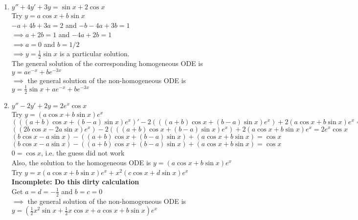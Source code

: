\documentclass[a4paper]{article}
\begin{document}
\begin{enumerate}
\begin{enumerate}
		\item $y''+4y'+3y=\sin x + 2\cos x$\\
		Try $y=a\cos x +b\sin x$\\
		$-a+4b+3a=2$ and $-b-4a+3b=1$\\
		$\implies a+2b=1$ and $-4a+2b=1$\\
		$\implies a=0$ and $b=1/2$\\
		$\implies y=\frac{1}{2}\sin x$ is a particular solution.\\
		The general solution of the corresponding homogeneous ODE is $y=ae^{-x}+be^{-3x}$\\
		$\implies$ the general solution of the non-homogeneous ODE is $y=\frac{1}{2}\sin x + ae^{-x}+be^{-3x}$
		
		\item $y''-2y'+2y=2e^x\cos x$\\
		Try $y=(a\cos x +b\sin x)e^x$\\
		$(((a+b)\cos x +(b-a)\sin x)e^x)'  -2(((a+b)\cos x +(b-a)\sin x)e^x) + 2(a\cos x +b\sin x)e^x =2e^x\cos x$\\
		$((2b\cos x - 2a\sin x)e^x)  -2(((a+b)\cos x +(b-a)\sin x)e^x) + 2(a\cos x +b\sin x)e^x =2e^x\cos x$\\
		$(b\cos x - a\sin x)  -((a+b)\cos x +(b-a)\sin x) + (a\cos x +b\sin x) =\cos x$\\
		$(b\cos x - a\sin x)  - ((a+b)\cos x +(b-a)\sin x) + (a\cos x +b\sin x) =\cos x$\\
		$0=\cos x$, i.e. the guess did not work \\Also, the solution to the homogeneous ODE is $y=(a\cos x +b\sin x)e^x$\\
		Try $y=x(a\cos x +b\sin x)e^x + x^2(c\cos x +d\sin x)e^x$\\
		\textbf{Incomplete: Do this dirty calculation}\\
		Get $a=d=-\frac{1}{2}$ and $b=c=0$\\
		$\implies$ the general solution of the non-homogeneous ODE is \\$y=(\frac{1}{2}x^2\sin x + \frac{1}{2}x\cos x + a\cos x +b\sin x)e^x$
		

\end{enumerate}
\end{enumerate}
\end{document}
